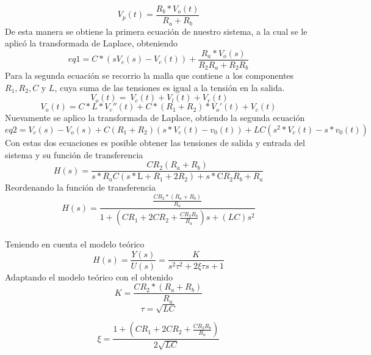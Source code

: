 \documentclass[10pt,a4paper]{article} %
\begin{document}
\begin{equation}
V_{p}(t)=\frac{R_{b}* V_{o}(t)}{R_{a}+R_{b}}
\end{equation}
De esta manera se obtiene la primera ecuación de nuestro sistema, a la cual se le aplicó la transformada de Laplace, obteniendo 
\begin{equation}
eq1=C* (s V_{c}(s)-V_{c}(t))+\frac{R_{a}* V_{o}(s)}{R_{2} R_{a} +R_{2} R_{b}}
\end{equation}
Para la segunda ecuación se recorrio la malla que contiene a los componentes $R_{1},R_{2}, C$ y $L$, cuya suma de las tensiones es igual a la tensión en la salida. 
\begin{equation}
\ V_{o}(t)=\ V_{c}(t)+ V_{l}(t)+ V_{r}(t)
\end{equation}
\begin{equation}
V_{o}(t)=C*L*V_{c}''(t)+ C*(R_{1}+R_{2})*V_{o}'(t)+V_{c}(t)
\end{equation}
Nuevamente se aplico la transformada de Laplace, obtiendo la segunda ecuación
\begin{equation}
eq2 = V_{c}(s) - V_{o}(s) + C(R_{1} + R_{2})(s*V_{c}(t) - v_{0}(t)) + 
LC(s^{2}*V_{c}(t) - s*v_{0}(t))
\end{equation}
Con estas dos ecuaciones es posible obtener las tensiones de salida y entrada del sistema y su función de transferencia 
\begin{equation}
H(s)=\frac{C R_{2} (R_{a}+R_{b})}{s*R_{a}C (s*\text{L} +R_{1}+2 R_{2})+s*\text{C}R_{2} R_{b} +R_{a}}
\end{equation}
Reordenando la función de transferencia
\begin{equation}
H(s)=\frac{\frac{CR_{2}*(R_{a}+R_{b})}{R_{a}}}{1+(CR_{1}+2CR_{2}+\frac{CR_{2}R_{b}}{R_{a}})s+(LC)s^{2}}
\end{equation}
\\
Teniendo en cuenta el modelo teórico 
\begin{equation}
H(s)=\dfrac{Y(s)}{U(s)}=\dfrac{K}{s^{2}\tau^{2}+2\xi \tau s+1}
\end{equation}
Adaptando el modelo teórico con el obtenido
\begin{equation}
K=\frac{CR_{2}*(R_{a}+R_{b})}{R_{a}}
\end{equation}
\begin{equation}
\tau=\sqrt{LC}
\end{equation}

\begin{equation}
\xi=\dfrac{1+(CR_{1}+2CR_{2}+\frac{CR_{2}R_{b}}{R_{a}})}{2\sqrt{LC}}
\end{equation}
\end{document}
